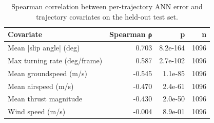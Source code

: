 \begin{table}[h!]
    \centering
    \caption{Spearman correlation between per-trajectory ANN error and trajectory covariates on the held-out test set.}
    \label{tab:covariates}
    \begin{tabular}{@{}lrrr@{}}
        \toprule
        Covariate & Spearman ρ & p & n \\
        \midrule
        Mean |slip angle| (deg) & 0.703 & 8.2e-164 & 1096 \\
        Max turning rate (deg/frame) & 0.587 & 2.7e-102 & 1096 \\
        Mean groundspeed (m/s) & -0.545 & 1.1e-85 & 1096 \\
        Mean airspeed (m/s) & -0.470 & 2.4e-61 & 1096 \\
        Mean thrust magnitude & -0.430 & 2.0e-50 & 1096 \\
        Wind speed (m/s) & -0.004 & 8.9e-01 & 1096 \\
        \bottomrule
    \end{tabular}
\end{table}
